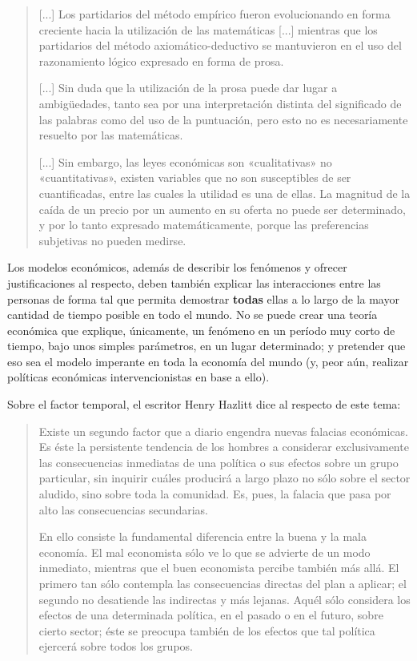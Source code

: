 \documentclass[12pt,a4paper,twoside]{book}
\begin{document}
\begin{quotation}
[...] Los partidarios del método empírico fueron evolucionando en forma creciente hacia la utilización de las matemáticas [...] mientras que los partidarios del método axiomático-deductivo se mantuvieron en el uso del razonamiento lógico expresado en forma de prosa.

[...] Sin duda que la utilización de la prosa puede dar lugar a ambigüedades, tanto sea por una interpretación distinta del significado de las palabras como del uso de la puntuación, pero esto no es necesariamente resuelto por las matemáticas.

[...] Sin embargo, las leyes económicas son «cualitativas» no «cuantitativas», existen variables que no son susceptibles de ser cuantificadas, entre las cuales la utilidad es una de ellas. La magnitud de la caída de un precio por un aumento en su oferta no puede ser determinado, y por lo tanto expresado matemáticamente, porque las preferencias subjetivas no pueden medirse. \cite[pág. 26-27]{elementos-econopol}
\end{quotation}

Los modelos económicos, además de describir los fenómenos y ofrecer justificaciones al respecto, deben también explicar las interacciones entre las personas de forma tal que permita demostrar \textbf{todas} ellas a lo largo de la mayor cantidad de tiempo posible en todo el mundo. No se puede crear una teoría económica que explique, únicamente, un fenómeno en un período muy corto de tiempo, bajo unos simples parámetros, en un lugar determinado; y pretender que eso sea el modelo imperante en toda la economía del mundo (y, peor aún, realizar políticas económicas intervencionistas en base a ello).

Sobre el factor temporal, el escritor Henry Hazlitt dice al respecto de este tema:

\begin{quotation}
Existe un segundo factor que a diario engendra nuevas falacias económicas. Es éste la persistente tendencia de los hombres a considerar exclusivamente las consecuencias inmediatas de una política o sus efectos sobre un grupo particular, sin inquirir cuáles producirá a largo plazo no sólo sobre el sector aludido, sino sobre toda la comunidad. Es, pues, la falacia que pasa por alto las consecuencias secundarias.

En ello consiste la fundamental diferencia entre la buena y la mala economía. El mal economista sólo ve lo que se advierte de un modo inmediato, mientras que el buen economista percibe también más allá. El primero tan sólo contempla las consecuencias directas del plan a aplicar; el segundo no desatiende las indirectas y más lejanas. Aquél sólo considera los efectos de una determinada política, en el pasado o en el futuro, sobre cierto sector; éste se preocupa también de los efectos que tal política ejercerá sobre todos los grupos. \cite[pág. 11]{hazlitt:econo1lec}
\end{quotation}
\end{document}
